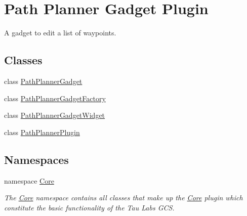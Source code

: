 \hypertarget{group___path_planner_gadget_plugin}{\section{\-Path \-Planner \-Gadget \-Plugin}
\label{group___path_planner_gadget_plugin}
}


\-A gadget to edit a list of waypoints.  


\subsection*{\-Classes}
\begin{DoxyCompactItemize}
\item 
class \hyperlink{class_path_planner_gadget}{\-Path\-Planner\-Gadget}
\item 
class \hyperlink{class_path_planner_gadget_factory}{\-Path\-Planner\-Gadget\-Factory}
\item 
class \hyperlink{class_path_planner_gadget_widget}{\-Path\-Planner\-Gadget\-Widget}
\item 
class \hyperlink{class_path_planner_plugin}{\-Path\-Planner\-Plugin}
\end{DoxyCompactItemize}
\subsection*{\-Namespaces}
\begin{DoxyCompactItemize}
\item 
namespace \hyperlink{namespace_core}{\-Core}
\begin{DoxyCompactList}\small\item\em \-The \hyperlink{namespace_core}{\-Core} namespace contains all classes that make up the \hyperlink{namespace_core}{\-Core} plugin which constitute the basic functionality of the \-Tau \-Labs \-G\-C\-S. \end{DoxyCompactList}\end{DoxyCompactItemize}
